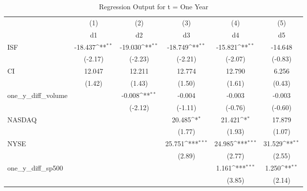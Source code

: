 \begin{table}[htbp]\centering
\def\sym#1{\ifmmode^{#1}\else\(^{#1}\)\fi}
\caption{Regression Output for t = One Year}
\begin{tabular}{l*{5}{c}}
\hline\hline
            &\multicolumn{1}{c}{(1)}         &\multicolumn{1}{c}{(2)}         &\multicolumn{1}{c}{(3)}         &\multicolumn{1}{c}{(4)}         &\multicolumn{1}{c}{(5)}         \\
            &          d1         &          d2         &          d3         &          d4         &          d5         \\
\hline
ISF         &     -18.437\sym{**} &     -19.030\sym{**} &     -18.749\sym{**} &     -15.821\sym{**} &     -14.648         \\
            &     (-2.17)         &     (-2.23)         &     (-2.21)         &     (-2.07)         &     (-0.83)         \\
[1em]
CI          &      12.047         &      12.211         &      12.774         &      12.790         &       6.256         \\
            &      (1.42)         &      (1.43)         &      (1.50)         &      (1.61)         &      (0.43)         \\
[1em]
one\_y\_diff\_volume&                     &      -0.008\sym{**} &      -0.004         &      -0.003         &      -0.003         \\
            &                     &     (-2.12)         &     (-1.11)         &     (-0.76)         &     (-0.60)         \\
[1em]
NASDAQ      &                     &                     &      20.485\sym{*}  &      21.421\sym{*}  &      17.879         \\
            &                     &                     &      (1.77)         &      (1.93)         &      (1.07)         \\
[1em]
NYSE        &                     &                     &      25.751\sym{***}&      24.985\sym{***}&      31.529\sym{**} \\
            &                     &                     &      (2.89)         &      (2.77)         &      (2.55)         \\
[1em]
one\_y\_diff\_sp500&                     &                     &                     &       1.161\sym{***}&       1.250\sym{**} \\
            &                     &                     &                     &      (3.85)         &      (2.14)         \\

\end{tabular}
\end{table}
